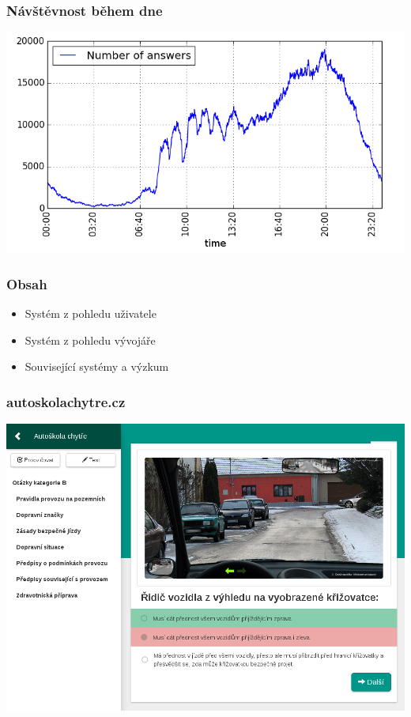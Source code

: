 \documentclass[xcolor=svgnames]{beamer}
\newcommand{\semitransp}[2][35]{\color{fg!#1}#2}
\begin{document}
\begin{frame}
	\frametitle{Návštěvnost během dne}
	 
   \includegraphics[width=\textwidth]{img/answers_in_day_by_minute_absolute.png}
\end{frame}
\begin{frame}
	\frametitle{Obsah}
  \begin{itemize}
  \semitransp[20]{
  \huge \item Systém z pohledu uživatele
  \huge \item Systém z pohledu vývojáře
}
  \semitransp[100]{ 
  \huge \item Související systémy a výzkum
  }
  \end{itemize}
\end{frame}
\begin{frame}
	\frametitle{autoskolachytre.cz}
	 
   \includegraphics[width=\textwidth]{img/autoskola.png}
\end{frame}
\end{document}
